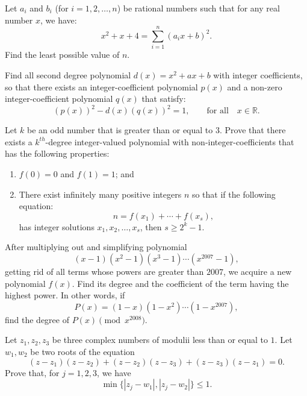 \documentclass[12pt,a4paper]{memoir}
\theoremstyle{definition}
\begin{document}
\begin{question}[name={2006 China TST}]
	Let $a_{i}$ and $b_{i}$ (for $i=1,2, \dots, n$) be rational numbers such that for any real number $x$, we have: \[x^{2}+x+4=\sum_{i=1}^{n}(a_{i}x+b)^{2}.\] Find the least possible value of $n$.
\end{question}




\begin{question}[name={2003 China TST}]
	Find all second degree polynomial $d(x)=x^{2}+ax+b$ with integer coefficients, so that there exists an integer-coefficient polynomial $p(x)$ and a non-zero integer-coefficient polynomial $q(x)$ that satisfy: \[\left( p(x) \right)^{2}-d(x) \left( q(x) \right)^{2}=1, \qquad \text{for all} \quad x \in \mathbb R.\]
\end{question}




\begin{question}[name={2006 China TST}]
	Let $k$ be an odd number that is greater than or equal to $3$. Prove that there exists a $k^{th}$-degree integer-valued polynomial with non-integer-coefficients that has the following properties:
	\begin{enumerate}
		\item $f(0)=0$ and $f(1)=1$; and
		\item There exist infinitely many positive integers $n$ so that if the following equation: \[ n= f(x_1)+\cdots+f(x_s), \] has integer solutions $x_1, x_2, \dots, x_s$, then $s \geq 2^k-1$.
	\end{enumerate} 
\end{question}


\begin{question}[name={2008 China TST}]
	After multiplying out and simplifying polynomial \[(x - 1)(x^2 - 1)(x^3 - 1)\cdots(x^{2007} - 1),\] getting rid of all terms whose powers are greater than $2007$, we acquire a new polynomial $f(x)$. Find its degree and the coefficient of the term having the highest power. In other words, if \[P(x) = (1 - x)(1 - x^{2})\cdots(1 - x^{2007}),\] find the degree of $P(x) \pmod {x^{2008}}$.
\end{question}

\begin{question}[name={2008 China TST}]
	Let $ z_{1},z_{2},z_{3}$ be three complex numbers of modulii less than or equal to $1$. Let $ w_{1},w_{2}$ be two roots of the equation \[(z - z_{1})(z - z_{2}) + (z - z_{2})(z - z_{3}) + (z - z_{3})(z - z_{1}) = 0.\] Prove that, for $ j = 1,2,3$, we have \[\min\{|z_{j} - w_{1}|,|z_{j} - w_{2}|\}\leq 1.\]
\end{question}
\end{document}
